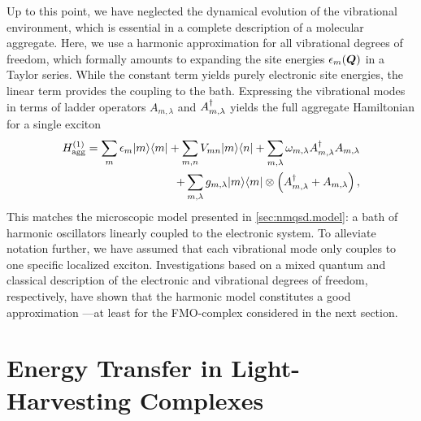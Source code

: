 
Up to this point, we have neglected the dynamical evolution of the vibrational environment, which is essential in a complete description of a molecular aggregate.
Here, we use a harmonic approximation for all vibrational degrees of freedom, which formally amounts to expanding the site energies $\epsilon_m(\boldsymbol{Q})$ in a Taylor series.
While the constant term yields purely electronic site energies, the linear term provides the coupling to the bath.
Expressing the vibrational modes in terms of ladder operators $A_{m, \lambda}$ and $A^\dagger_{m, \lambda}$ yields the full aggregate Hamiltonian for a single exciton
\begin{align}
  \label{eq:app.agg_hamil_twolevel}
  H_\mathrm{agg}^{(1)} =
  \sum_m \epsilon_m | m \rangle\langle m | + \sum_{m,n} V_{mn} | m \rangle\langle n | + \sum_{m, \lambda} \omega_{m, \lambda} A^\dagger_{m, \lambda} A_{m, \lambda} \\
  + \sum_{m, \lambda} g_{m, \lambda} | m \rangle\langle m | \otimes \left( A^\dagger_{m, \lambda} + A_{m, \lambda} \right) \nonumber,
\end{align}
This matches the microscopic model presented in \autoref{sec:nmqsd.model}: a bath of harmonic oscillators linearly coupled to the electronic system.
To alleviate notation further, we have assumed that each vibrational mode only couples to one specific localized exciton.
Investigations based on a mixed quantum and classical description of the electronic and vibrational degrees of freedom, respectively, have shown that the harmonic model constitutes a good approximation \cite{VaEiAs12_bcf}---at least for the FMO-complex considered in the next section.



\section{Energy Transfer in Light-Harvesting Complexes}
\label{sec:app.fmo}

